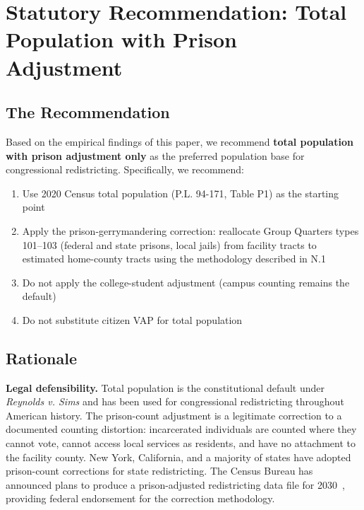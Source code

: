 \section{Statutory Recommendation: Total Population with Prison Adjustment}
\label{sec:recommendation}

\subsection{The Recommendation}

Based on the empirical findings of this paper, we recommend \textbf{total population with prison adjustment only} as the preferred population base for congressional redistricting. Specifically, we recommend:

\begin{enumerate}
    \item Use 2020 Census total population (P.L. 94-171, Table P1) as the starting point
    \item Apply the prison-gerrymandering correction: reallocate Group Quarters types 101--103 (federal and state prisons, local jails) from facility tracts to estimated home-county tracts using the methodology described in N.1~\citep{dellalibera2026n1}
    \item Do not apply the college-student adjustment (campus counting remains the default)
    \item Do not substitute citizen VAP for total population
\end{enumerate}

\subsection{Rationale}

\textbf{Legal defensibility.} Total population is the constitutional default under \emph{Reynolds v. Sims} and has been used for congressional redistricting throughout American history. The prison-count adjustment is a legitimate correction to a documented counting distortion: incarcerated individuals are counted where they cannot vote, cannot access local services as residents, and have no attachment to the facility county. New York, California, and a majority of states have adopted prison-count corrections for state redistricting. The Census Bureau has announced plans to produce a prison-adjusted redistricting data file for 2030~\citep{census2022prison_adjustment}, providing federal endorsement for the correction methodology.

